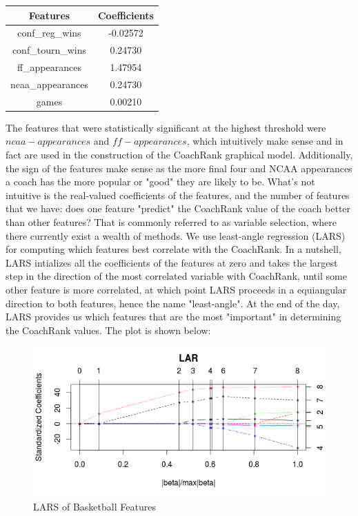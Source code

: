 \documentclass[11pt,notitlepage]{article}
\begin{document}
\begin{center}
\begin{tabular}{ | c | c |}
\hline
Features            & Coefficients \\\hline
conf\_reg\_wins       & -0.02572      \\\hline
conf\_tourn\_wins     & 0.24730     \\\hline
ff\_appearances      &  1.47954    \\\hline
ncaa\_appearances    & 0.24730      \\\hline
games               & 0.00210      \\
\hline
\end{tabular}
\end{center}

\vspace{2 mm}

\noindent The features that were statistically significant at the highest threshold were $ncaa-appearances$ and $ff-appearances$, which intuitively make sense and in fact are used in the construction of the CoachRank graphical model. Additionally, the sign of the features make sense as the more final four and NCAA appearances a coach has the more popular or "good" they are likely to be. What's not intuitive is the real-valued coefficients of the features, and the number of features that we have: does one feature "predict" the CoachRank value of the coach better than other features? That is commonly referred to as variable selection, where there currently exist a wealth of methods. We use least-angle regression (LARS) for computing which features best correlate with the CoachRank. In a nutshell, LARS intializes all the coefficients of the features at zero and takes the largest step in the direction of the most correlated variable with CoachRank, until some other feature is more correlated, at which point LARS proceeds in a equiangular direction to both features, hence the name "least-angle". At the end of the day, LARS provides us which features that are the most "important" in determining the CoachRank values. The plot is shown below:

\begin{figure}[H]
      \caption{LARS of Basketball Features}
      \centering
      \includegraphics[width=1.0\textwidth]{bball_lars.png}
\end{figure}
\end{document}
